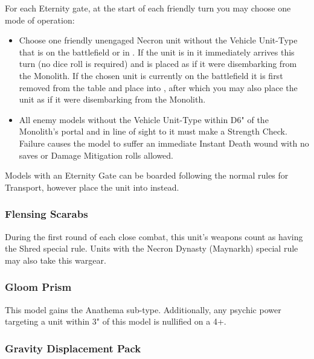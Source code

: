 For each Eternity gate, at the start of each friendly turn you may choose one mode of operation:

\begin{itemize}
	\item Choose one friendly unengaged Necron unit without the Vehicle Unit-Type that is on the battlefield or in . If the unit is in  it immediately arrives this turn (no dice roll is required) and is placed as if it were disembarking from the Monolith. If the chosen unit is currently on the battlefield it is first removed from the table and place into , after which you may also place the unit as if it were disembarking from the Monolith.
	\item All enemy models without the Vehicle Unit-Type within D6" of the Monolith's portal and in line of sight to it must make a Strength Check. Failure causes the model to suffer an immediate Instant Death wound with no saves or Damage Mitigation rolls allowed.
\end{itemize}

Models with an Eternity Gate can be boarded following the normal rules for Transport, however place the unit into  instead.


\subsubsection{Flensing Scarabs} \label{Flensing Scarabs}

During the first round of each close combat, this unit's weapons count as having the Shred special rule. Units with the Necron Dynasty (Maynarkh) special rule may also take this wargear.

\subsubsection{Gloom Prism} \label{Gloom Prism}

This model gains the Anathema sub-type. Additionally, any psychic power targeting a unit within 3" of this model is nullified on a 4+. \\

\subsubsection{Gravity Displacement Pack} \label{Gravity Displacement Pack}

